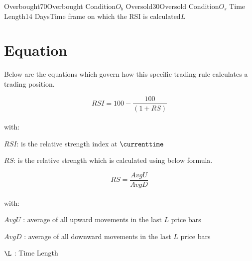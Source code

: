\documentclass{article}
\begin{document}
\logo
{} %
\tblofcontents

{Overbought}{70}{Overbought Condition}{$O_b$}
{Oversold}{30}{Oversold Condition}{$O_s$}
{Time Length}{14 Days}{Time frame on which the RSI is calculated}{$L$}
\stoptable %


\section{Equation}
Below are the equations which govern how this specific trading rule calculates a trading position.

\begin{equation}
RSI = 100-\frac{100}{(1+RS)}
\end{equation}
\\
with:

$RSI$: is the relative strength index at $\currenttime$

$RS$: is the relative strength which is calculated using below formula.

\begin{equation}
RS = \frac{AvgU}{AvgD}
\end{equation}
\\
with:

$AvgU$ : average of all upward movements in the last $L$ price bars

$AvgD$ : average of all downward movements in the last $L$ price bars

$\L$ : Time Length

\keyterms
\furtherlinks %
\end{document}
